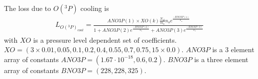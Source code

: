 \documentclass[12pt]{book}
\begin{document}
%
\\
The loss due to $O(^3P)$ cooling is
%
\begin{align}
  L_{O(^3P)_{cool}} = \frac{ANO3P(1) \times XO(k) \frac{N_A}{m_o} n_o
  e^{\frac{-BNO3P(1)}{T_n}}}{1+ANO3P(2) e^{\frac{-BNO3P(2)}{T_n}}+ANO3P(3)
  e^{\frac{-BNO3P(3)}{T_n}}}
\end{align}
%
with $XO$ is a pressure level dependent set of coefficients. $XO = (3 \times 0.01,
0.05,0.1,0.2,0.4,0.55,0.7,0.75,15\times 0.0)$. $ANO3P$ is a 3 element array of
constants $ANO3P = (1.67 \cdot 10^{-18},0.6,0.2)$. $BNO3P$ is a three element array
of constants $BNO3P = (228,228,325)$.

%
\end{document}
